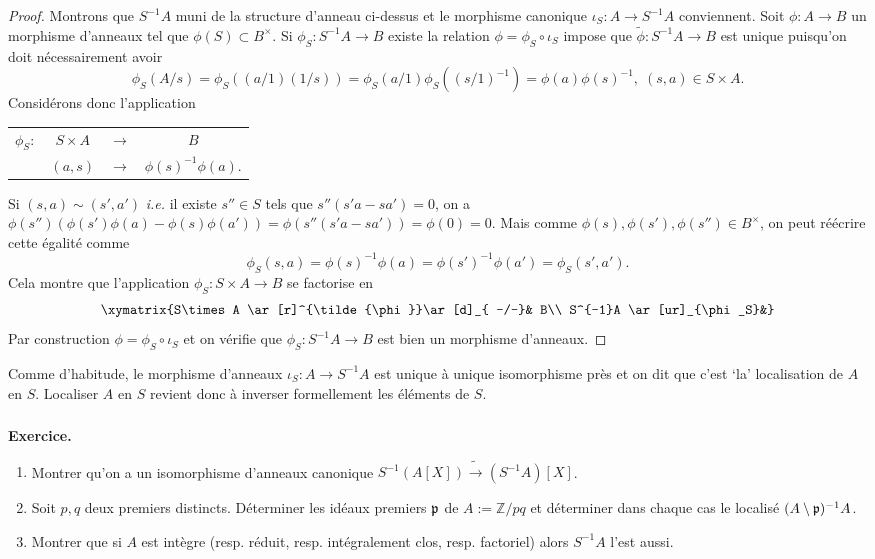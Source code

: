\documentclass[a4paper, 12pt]{amsart}
\newcommand{\Z}{\mathbb{Z}}
\begin{document}
 \begin{proof} Montrons que  $S^{-1}A$ muni de la structure d'anneau ci-dessus et le morphisme canonique $\iota_S:A\rightarrow S^{-1}A$ conviennent. Soit $\phi:A\rightarrow B$  un morphisme d'anneaux tel que $\phi(S)\subset B^\times$.  Si $\phi_S:S^{-1}A\rightarrow B$ existe la relation $\phi=  \phi_S\circ \iota_S$ impose que  $\tilde{\phi}:S^{-1}A\rightarrow B$ est unique puisqu'on doit n\'ecessairement avoir 
 $$\phi_S(A/s)=\phi_S((a/1)(1/s))=\phi_S(a/1)\phi_S((s/1)^{-1})=\phi(a)\phi(s)^{-1},\; (s,a)\in S\times A.$$
 Consid\'erons donc l'application  \begin{tabular}[t]{lclc}
 $\phi_S:$&$ S\times A $&$\rightarrow$&$B$\\
 &$(a,s) $&$\rightarrow$&$ \phi(s)^{-1}\phi(a)$.
 \end{tabular} 
 Si $(s,a)\sim (s',a')$  \textit{i.e.} il existe $s''\in S$ tels que $s''(s'a-sa')=0$, on a $\phi(s'')(\phi(s')\phi(a)-\phi(s)\phi(a'))=\phi(s''(s'a-sa'))=\phi(0)=0$. Mais comme $\phi(s),\phi(s'),\phi(s'')\in B^{\times}$, on peut r\'e\'ecrire cette \'egalit\'e comme 
 $$\phi_S(s,a)=\phi(s)^{-1}\phi(a)=\phi(s')^{-1}\phi(a')=\phi_S(s',a').$$
 Cela montre que l'application $\phi_S: S\times A  \rightarrow  B$ se factorise  en 
 $$\xymatrix{S\times A \ar[r]^{\tilde{\phi}}\ar[d]_{  -/-}& B\\
 S^{-1}A \ar[ur]_{\phi_S}&} $$
Par construction $\phi=  \phi_S\circ \iota_S$ et on v\'erifie que $\phi_S:S^{-1}A\rightarrow B$ est bien un morphisme d'anneaux. 
  \end{proof}
 
 \noindent Comme d'habitude, le morphisme d'anneaux  $\iota_S:A\rightarrow S^{-1}A$ est unique \`a unique isomorphisme pr\`es et on dit que  c'est `la' localisation de $A$ en $S$. Localiser $A$ en $S$ revient donc \`a inverser formellement les \'el\'ements de $S$.  \\
 
 \subsubsection{}\label{LocExo1}\textbf{Exercice.} 
 \begin{enumerate}
 \item  Montrer qu'on a un isomorphisme  d'anneaux canonique $S^{-1}(A[X])\tilde{\rightarrow} (S^{-1}A)[X]$.
 \item Soit $p,q$ deux premiers distincts. D\'eterminer les id\'eaux premiers $\frak{p}$ de $A:=\Z/pq$ et d\'eterminer dans chaque cas le localis\'e $(A\setminus \frak{p})^{-1}A$.
 \item Montrer que si $A$ est int\`egre (resp. r\'eduit, resp. int\'egralement clos, resp. factoriel) alors $S^{-1}A$ l'est aussi.\\
 \end{enumerate}
 
\end{document}
